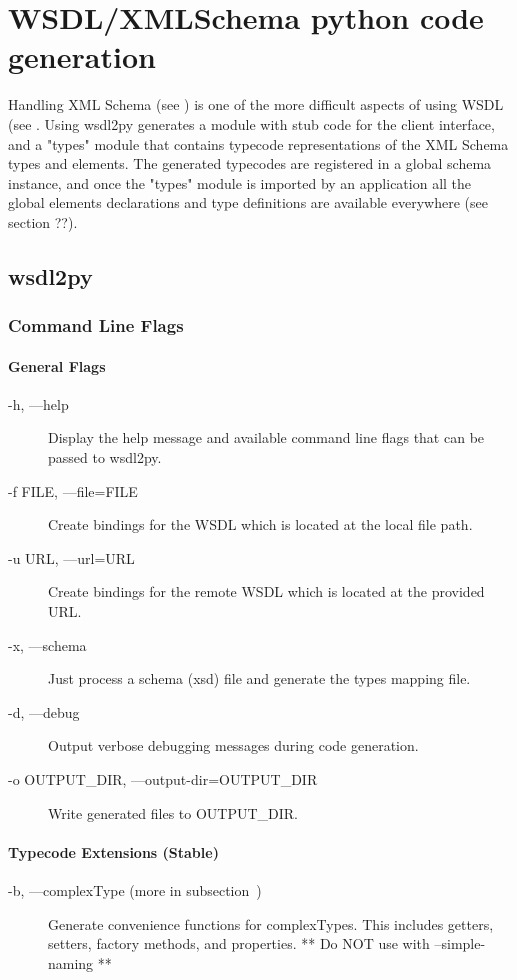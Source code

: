 \chapter{WSDL/XMLSchema python code generation}

Handling XML Schema (see ) 
is one of the more difficult aspects of using WSDL (see
.  
Using wsdl2py generates a module with stub code for the client interface,
and a "types" module that contains typecode representations of the XML Schema types and elements.  The generated typecodes are registered in a global schema instance, and once the "types" module is imported by an application all the global elements declarations and type definitions are available everywhere (see section ??).  

\section{wsdl2py}

\subsection{Command Line Flags}

\subsubsection{General Flags}
\begin{description}
\item[-h, ---help] Display the help message and available command line
flags that can be passed to wsdl2py.
\item[-f FILE, ---file=FILE] Create bindings for the WSDL which is located at
the local file path.
\item[-u URL, ---url=URL] Create bindings for the remote WSDL which is located
at the provided URL.
\item[-x, ---schema] Just process a schema (xsd) file and generate the types
mapping file.
\item[-d, ---debug] Output verbose debugging messages during code generation.
\item[-o OUTPUT_DIR, ---output-dir=OUTPUT_DIR] Write generated files to OUTPUT_DIR.
\end{description}

\subsubsection{Typecode Extensions (Stable) }
\begin{description}
\item[-b, ---complexType (more in subsection~\label{subsubsection:complexType})]
Generate convenience functions for complexTypes.  This includes getters,
setters, factory methods, and properties.  ** Do NOT use with --simple-naming **
\end{description}

